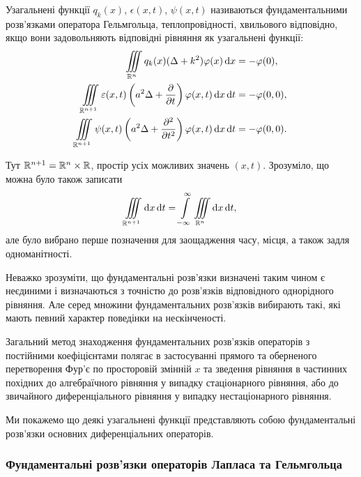 \begin{definition}
	Узагальнені функції $q_k(x)$, $\epsilon(x, t)$, $\psi(x, t)$ називаються фундаментальними розв'язками оператора Гельмгольца, теплопровідності, хвильового відповідно, якщо вони задовольняють відповідні рівняння як узагальнені функції:
	\begin{align}
		\displaystyle\iiint\limits_{\mathbb{R}^n} q_k(x) (\Delta + k^2) \varphi(x) \mathop{}\!\mathrm{d} x &= - \varphi(0), \\
		\displaystyle\iiint\limits_{\mathbb{R}^{n + 1}} \varepsilon(x, t) \left( a^2 \Delta + \frac{\partial}{\partial t}\right) \varphi(x, t) \mathop{}\!\mathrm{d} x \mathop{}\!\mathrm{d} t &= - \varphi(0, 0), \\
		\displaystyle\iiint\limits_{\mathbb{R}^{n + 1}} \psi(x, t) \left( a^2 \Delta + \frac{\partial^2}{\partial t^2}\right) \varphi(x, t) \mathop{}\!\mathrm{d} x \mathop{}\!\mathrm{d} t &= - \varphi(0, 0).
	\end{align}
\end{definition}

\begin{remark}
	Тут $\mathbb{R}^{n+1} = \mathbb{R}^n \times \mathbb{R}$, простір усіх можливих значень $(x, t)$. Зрозуміло, що можна було також записати
	\begin{equation}
		\displaystyle\iiint\limits_{\mathbb{R}^{n + 1}} \mathop{}\!\mathrm{d} x \mathop{}\!\mathrm{d} t = \displaystyle\int\limits_{-\infty}^\infty \displaystyle\iiint\limits_{\mathbb{R}^n} \mathop{}\!\mathrm{d} x \mathop{}\!\mathrm{d} t,
	\end{equation}
	але було вибрано перше позначення для заощадження часу, місця, а також задля одноманітності.
\end{remark}

\begin{remark}
	Неважко зрозуміти, що фундаментальні роз\-в'яз\-ки визначені таким чином є неєдиними і визначаються з точністю до розв'язків відповідного однорідного рівняння. Але серед множини фундаментальних розв'язків вибирають такі, які мають певний характер поведінки на нескінченості.
\end{remark}

Загальний метод знаходження фундаментальних розв'язків операторів з постійними коефіцієнтами полягає в застосуванні прямого та оберненого перетворення Фур'є по просторовій змінній $x$ та зведення рівняння в частинних похідних до алгебраїчного рівняння у випадку стаціонарного рівняння, або до звичайного диференціального рівняння у випадку нестаціонарного рівняння. \medskip

Ми покажемо що деякі узагальнені функції представляють собою фундаментальні розв'язки основних диференціальних операторів.

\subsubsection{Фундаментальні розв'язки операторів Лапласа та Гельмгольца}

